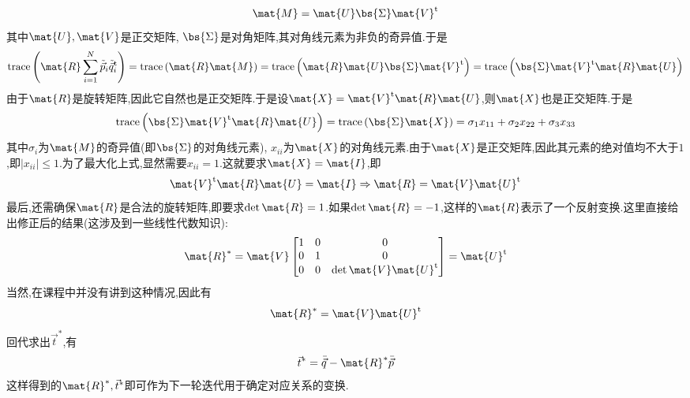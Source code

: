 \documentclass{ctexart}
\begin{document}
\[\mat{M}=\mat{U}\bs{\Sigma}\mat{V}^{\text{t}}\]
其中$\mat{U},\mat{V}$是正交矩阵, $\bs{\Sigma}$是对角矩阵,其对角线元素为非负的奇异值.于是
\[\text{trace}\left(\mat{R}\sum_{i=1}^{N}\tilde{\vec{p}}_i\tilde{\vec{q}}_i^{\text{t}}\right)=\text{trace}\left(\mat{R}\mat{M}\right)=\text{trace}\left(\mat{R}\mat{U}\bs{\Sigma}\mat{V}^{\text{t}}\right)=\text{trace}\left(\bs{\Sigma}\mat{V}^{\text{t}}\mat{R}\mat{U}\right)\]
由于$\mat{R}$是旋转矩阵,因此它自然也是正交矩阵.于是设$\mat{X}=\mat{V}^{\text{t}}\mat{R}\mat{U}$,则$\mat{X}$也是正交矩阵.于是
\[\text{trace}\left(\bs{\Sigma}\mat{V}^{\text{t}}\mat{R}\mat{U}\right)=\text{trace}\left(\bs{\Sigma}\mat{X}\right)=\sigma_1x_{11}+\sigma_2x_{22}+\sigma_3x_{33}\]
其中$\sigma_i$为$\mat{M}$的奇异值(即$\bs{\Sigma}$的对角线元素), $x_{ii}$为$\mat{X}$的对角线元素.由于$\mat{X}$是正交矩阵,因此其元素的绝对值均不大于$1$,即$|x_{ii}|\leq 1$.为了最大化上式,显然需要$x_{ii}=1$.这就要求$\mat{X}=\mat{I}$,即
\[\mat{V}^{\text{t}}\mat{R}\mat{U}=\mat{I}\Rightarrow \mat{R}=\mat{V}\mat{U}^{\text{t}}\]
最后,还需确保$\mat{R}$是合法的旋转矩阵,即要求$\det\mat{R}=1$.如果$\det\mat{R}=-1$,这样的$\mat{R}$表示了一个反射变换.这里直接给出修正后的结果(这涉及到一些线性代数知识):
\[\mat{R}^\ast=\mat{V}\begin{bmatrix}
    1&0&0\\0&1&0\\0&0&\det\mat{V}\mat{U}^{\text{t}}
\end{bmatrix}=\mat{U}^{\text{t}}\]
当然,在课程中并没有讲到这种情况,因此有
\[\mat{R}^\ast=\mat{V}\mat{U}^{\text{t}}\]
回代求出$\vec{t}^\ast$,有
\[\vec{t}^\ast=\bar{\vec{q}}-\mat{R}^\ast\bar{\vec{p}}\]
这样得到的$\mat{R}^\ast,\vec{t}^\ast$即可作为下一轮迭代用于确定对应关系的变换.
\end{document}
